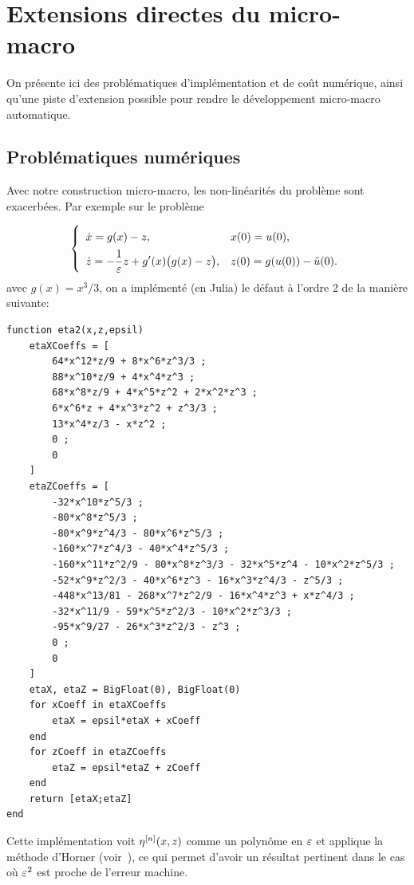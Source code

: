 \section{Extensions directes du micro-macro}
\label{ext:sec:direct}

On présente ici des problématiques d'implémentation et de coût numérique, ainsi qu'une piste d'extension possible pour rendre le développement micro-macro automatique.


\subsection{Problématiques numériques}

Avec notre construction micro-macro, les non-linéarités du problème sont exacerbées. Par exemple sur le problème

\begin{equation*} 
    \left\lbrace\begin{array}{ll} \displaystyle \vphantom{\int}
      \dot x = g(x) - z , 
      & x(0) = u(0) , \\ \displaystyle
      \dot z = -\frac{1}{\varepsilon} z + g'(x) \big( g(x) - z \big) ,
      & z(0) = g(u(0)) - \tilde{u}(0) .
    \end{array}\right.
\end{equation*}
avec $g(x) = x^3/3$, on a implémenté (en Julia) le défaut à l'ordre 2 de la manière suivante:


\begin{lstlisting}
function eta2(x,z,epsil)
    etaXCoeffs = [
        64*x^12*z/9 + 8*x^6*z^3/3 ;
        88*x^10*z/9 + 4*x^4*z^3 ;
        68*x^8*z/9 + 4*x^5*z^2 + 2*x^2*z^3 ;
        6*x^6*z + 4*x^3*z^2 + z^3/3 ;
        13*x^4*z/3 - x*z^2 ;
        0 ;
        0
    ]
    etaZCoeffs = [
        -32*x^10*z^5/3 ;
        -80*x^8*z^5/3 ;
        -80*x^9*z^4/3 - 80*x^6*z^5/3 ;
        -160*x^7*z^4/3 - 40*x^4*z^5/3 ;
        -160*x^11*z^2/9 - 80*x^8*z^3/3 - 32*x^5*z^4 - 10*x^2*z^5/3 ;
        -52*x^9*z^2/3 - 40*x^6*z^3 - 16*x^3*z^4/3 - z^5/3 ;
        -448*x^13/81 - 268*x^7*z^2/9 - 16*x^4*z^3 + x*z^4/3 ;
        -32*x^11/9 - 59*x^5*z^2/3 - 10*x^2*z^3/3 ;
        -95*x^9/27 - 26*x^3*z^2/3 - z^3 ;
        0 ;
        0
    ]
    etaX, etaZ = BigFloat(0), BigFloat(0)
    for xCoeff in etaXCoeffs
        etaX = epsil*etaX + xCoeff
    end
    for zCoeff in etaZCoeffs
        etaZ = epsil*etaZ + zCoeff
    end
    return [etaX;etaZ]
end
\end{lstlisting}
%
Cette implémentation voit $\eta^{[n]}(x,z)$ comme un polynôme en $\varepsilon$ et applique la méthode d'Horner (voir~\cite[Sec.~4.6.4]{knuth.2014.art}), ce qui permet d'avoir un résultat pertinent dans le cas où $\varepsilon^2$ est proche de l'erreur machine. 

